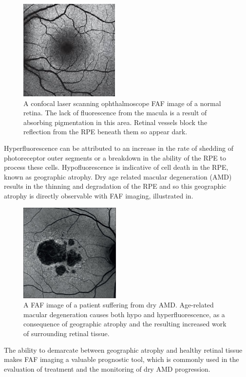 \begin{figure}[htbp]
\centering
  \includegraphics{figures/faf}
\caption{A confocal laser scanning ophthalmoscope FAF image of a normal retina. The lack of fluorescence from the macula is a result of absorbing pigmentation in this area. Retinal vessels block the reflection from the RPE beneath them so appear dark.}
\label{fig:faf}
     \end{figure}

Hyperfluorescence can be attributed to an increase in the rate of shedding of photoreceptor outer segments or a breakdown in the ability of the RPE to process these cells. Hypofluorescence is indicative of cell death in the RPE, known as geographic atrophy. Dry age related macular degeneration (AMD) results in the thinning and degradation of the RPE and so this geographic atrophy is directly observable with FAF imaging, illustrated in.

\begin{figure}[htbp]
\centering
  \includegraphics{figures/fafamd}
\caption{A FAF image of a patient suffering from dry AMD. Age-related macular degeneration causes both hypo and hyperfluorescence, as a consequence of geographic atrophy and the resulting increased work of surrounding retinal tissue.}
\label{fig:fafamd}
     \end{figure}

The ability to demarcate between geographic atrophy and healthy retinal tissue makes FAF imaging a valuable prognostic tool, which is commonly used in the evaluation of treatment and the monitoring of dry AMD progression. 

